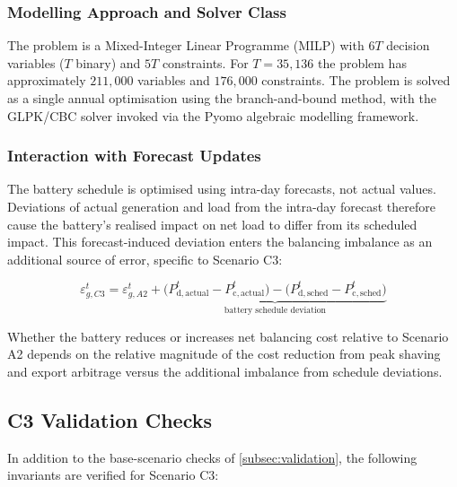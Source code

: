 \documentclass[12pt,a4paper]{article}
\begin{document}
\subsubsection{Modelling Approach and Solver Class}

The problem is a Mixed-Integer Linear Programme (MILP) with $6T$ decision
variables ($T$ binary) and $5T$ constraints.  For $T = 35{,}136$ the problem
has approximately $211{,}000$ variables and $176{,}000$ constraints.  The
problem is solved as a single annual optimisation using the branch-and-bound
method, with the GLPK/CBC solver invoked via the Pyomo algebraic modelling
framework.

\subsubsection{Interaction with Forecast Updates}

The battery schedule is optimised using intra-day forecasts, not actual values.
Deviations of actual generation and load from the intra-day forecast therefore
cause the battery's realised impact on net load to differ from its scheduled
impact.  This forecast-induced deviation enters the balancing imbalance as an
additional source of error, specific to Scenario C3:

\begin{equation}
\varepsilon_{g,C3}^{t} = \varepsilon_{g,A2}^{t}
  + \underbrace{
    \bigl(P_{\mathrm{d,actual}}^{t} - P_{\mathrm{c,actual}}^{t}\bigr)
    - \bigl(P_{\mathrm{d,sched}}^{t} - P_{\mathrm{c,sched}}^{t}\bigr)
  }_{\text{battery schedule deviation}}
\label{eq:battery_imbalance}
\end{equation}

Whether the battery reduces or increases net balancing cost relative to
Scenario A2 depends on the relative magnitude of the cost reduction from
peak shaving and export arbitrage versus the additional imbalance from
schedule deviations.

\subsection{C3 Validation Checks}
\label{subsec:c3_validation}

In addition to the base-scenario checks of \cref{subsec:validation}, the
following invariants are verified for Scenario C3:
\end{document}
